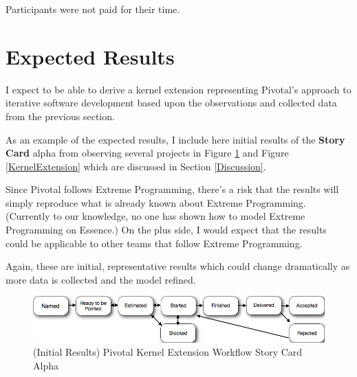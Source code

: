 \documentclass[preprint,12pt,3p]{elsarticle}
\begin{document}
{Participants were not paid for their time. 

\section{Expected Results}

I expect to be able to derive a kernel extension representing Pivotal's approach to iterative software development based upon the  observations and collected data from the previous section.

As an example of the expected results, I include here initial results of the \textbf{Story Card} alpha from observing several projects in Figure \ref{KernelExtensionWorkflow} and Figure \ref{KernelExtension} which are discussed in Section \ref{Discussion}.

Since Pivotal follows Extreme Programming, there's a risk that the results will simply reproduce what is already known about Extreme Programming. (Currently to our knowledge, no one has shown how to model Extreme Programming on Essence.) On the plus side, I would expect that the results could be applicable to other teams that follow Extreme Programming.

Again, these are initial, representative results which could change dramatically as more data is collected and the model refined.

\begin{figure}[ht]
\includegraphics[width=6.25in]{pivotal_images/story_card_workflow}
\caption{(Initial Results) Pivotal Kernel Extension Workflow Story Card Alpha}
\label{KernelExtensionWorkflow}
\end{figure}

}
\end{document}
